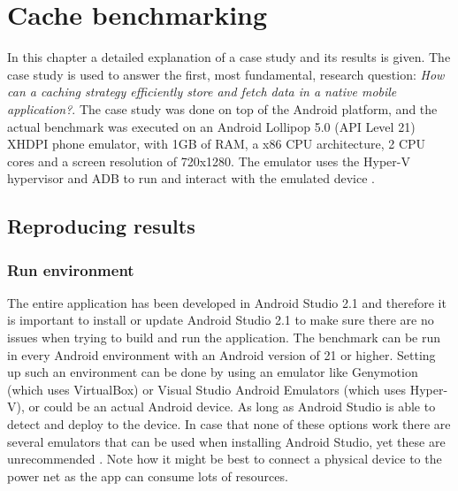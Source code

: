 \documentclass[pdftex,a4paper,12pt,twoside]{report}
\begin{document}
\chapter{Cache benchmarking}
In this chapter a detailed explanation of a case study and its results is given. The case study is used to answer the first, most fundamental, research question: \emph{How can a caching strategy efficiently store and fetch data in a native mobile application?}.
The case study was done on top of the Android platform, and the actual benchmark was executed on an Android Lollipop 5.0 (API Level 21) XHDPI phone emulator, with 1GB of RAM, a x86 CPU architecture, 2 CPU cores and a screen resolution of 720x1280. The emulator uses the Hyper-V hypervisor and ADB to run and interact with the emulated device \citep{visual_studio_emulator}.
\section{Reproducing results}
\subsection{Run environment}
The entire application has been developed in Android Studio 2.1 and therefore it is important to install or update Android Studio 2.1 to make sure there are no issues when trying to build and run the application.
The benchmark can be run in every Android environment with an Android version of 21 or higher. Setting up such an environment can be done by using an emulator like Genymotion (which uses VirtualBox) or Visual Studio Android Emulators (which uses Hyper-V), or could be an actual Android device. As long as Android Studio is able to detect and deploy to the device. In case that none of these options work there are several emulators that can be used when installing Android Studio, yet these are unrecommended \citep{android_studio_embedded_emulators}. Note how it might be best to connect a physical device to the power net as the app can consume lots of resources.
\end{document}
